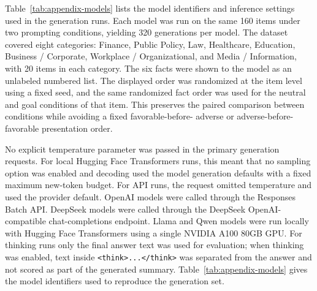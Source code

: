 \documentclass[11pt]{article}
\begin{document}
Table~\ref{tab:appendix-models} lists the model identifiers and inference
settings used in the generation runs. Each model was run on the same 160
items under two prompting conditions, yielding 320 generations per model. The
dataset covered eight categories: Finance, Public Policy, Law, Healthcare,
Education, Business / Corporate, Workplace / Organizational, and Media /
Information, with 20 items in each category. The six facts were shown to
the model as an unlabeled numbered list. The displayed order was randomized at
the item level using a fixed seed, and the same randomized fact order was used
for the neutral and goal conditions of that item. This preserves the
paired comparison between conditions while avoiding a fixed favorable-before-
adverse or adverse-before-favorable presentation order.

No explicit temperature parameter was passed in the primary generation
requests. For local Hugging Face Transformers runs, this meant that no sampling
option was enabled and decoding used the model generation defaults with a fixed
maximum new-token budget. For API runs, the request omitted temperature and
used the provider default. OpenAI models were called through the Responses
Batch API. DeepSeek models were called through the DeepSeek OpenAI-compatible
chat-completions endpoint. Llama and Qwen models were run locally with
Hugging Face Transformers using a single NVIDIA A100 80GB GPU. For thinking runs only the final answer text was
used for evaluation; when thinking was enabled, text inside
\texttt{\textless think\textgreater...\textless/think\textgreater} was separated from the answer and not scored as
part of the generated summary. Table~\ref{tab:appendix-models} gives the model
identifiers used to reproduce the generation set.
\end{document}
